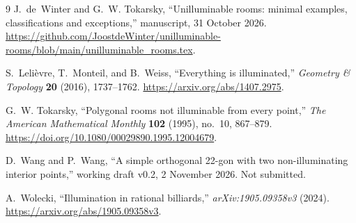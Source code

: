 \documentclass[11pt]{article}
\theoremstyle{remark}
\begin{document}
\begin{thebibliography}{9}
J.~de~Winter and G.~W. Tokarsky, ``Unilluminable rooms: minimal examples, classifications and exceptions,''
manuscript, 31 October 2026.
\url{https://github.com/JoostdeWinter/unilluminable-rooms/blob/main/unilluminable_rooms.tex}.

S.~Lelièvre, T.~Monteil, and B.~Weiss, ``Everything is illuminated,''
\emph{Geometry \& Topology} \textbf{20} (2016), 1737--1762.
\url{https://arxiv.org/abs/1407.2975}.

G.~W. Tokarsky, ``Polygonal rooms not illuminable from every point,''
\emph{The American Mathematical Monthly} \textbf{102} (1995), no.~10, 867--879.
\url{https://doi.org/10.1080/00029890.1995.12004679}.

D.~Wang and P.~Wang, ``A simple orthogonal 22-gon with two non-illuminating interior points,''
working draft v0.2, 2 November 2026. Not submitted.

A.~Wolecki, ``Illumination in rational billiards,''
\emph{arXiv:1905.09358v3} (2024).
\url{https://arxiv.org/abs/1905.09358v3}.
\end{thebibliography}
\end{document}
